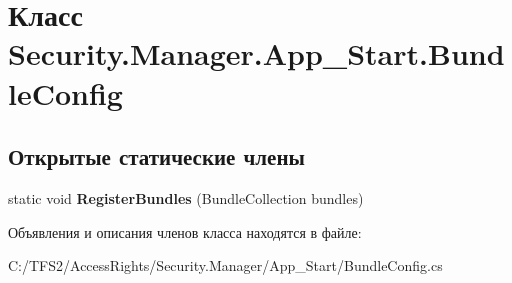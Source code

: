 \hypertarget{class_security_1_1_manager_1_1_app___start_1_1_bundle_config}{}\section{Класс Security.\+Manager.\+App\+\_\+\+Start.\+Bundle\+Config}
\label{class_security_1_1_manager_1_1_app___start_1_1_bundle_config}
\subsection*{Открытые статические члены}
\begin{DoxyCompactItemize}
\item 
\mbox{\label{class_security_1_1_manager_1_1_app___start_1_1_bundle_config_a8c1c9e111cc4353a7facbfbabb4273bd}} 
static void {\bfseries Register\+Bundles} (Bundle\+Collection bundles)
\end{DoxyCompactItemize}


Объявления и описания членов класса находятся в файле\+:\begin{DoxyCompactItemize}
\item 
C\+:/\+T\+F\+S2/\+Access\+Rights/\+Security.\+Manager/\+App\+\_\+\+Start/Bundle\+Config.\+cs\end{DoxyCompactItemize}
